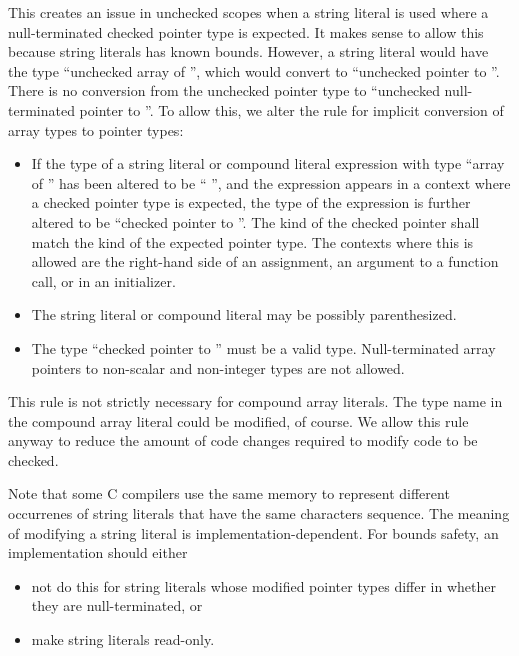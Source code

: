 This creates an issue in unchecked scopes when a string literal is used where
a null-terminated checked pointer type is expected.  It makes sense to allow
this because string literals has known bounds.  However, a string
literal would have the type ``unchecked array of '', which
would convert to ``unchecked pointer to ''.
There is no conversion from the unchecked pointer type to
``unchecked null-terminated pointer to ''.
To allow this, we alter the rule for implicit conversion of array types to pointer types:
\begin{itemize}
\item If the type of a string literal or compound literal expression with type
``array of '' has been altered to be `` \keyword{*}'', and the expression
appears in a context where a checked pointer type is expected, the type of the expression
is further altered to be ``checked pointer to ''.  The kind of the checked
pointer shall match the kind of the expected pointer type. The contexts where this
is allowed are the right-hand side of an assignment, an argument to a function call, or in
an initializer.
\item The string literal or compound literal may be possibly parenthesized.
\item The type ``checked pointer to '' must be a valid type.  Null-terminated array pointers
to non-scalar and non-integer types are not allowed.
\end{itemize}
This rule is not strictly necessary for compound array literals.  The type name in the
compound array literal could be modified, of course.  We allow this rule anyway to reduce
the amount of code changes required to modify code to be checked.

Note that some C compilers use the same memory to represent different
occurrenes of string literals that have the same characters
sequence.  The meaning of modifying a string literal is implementation-dependent.
For bounds safety, an implementation should either
\begin{itemize}
\item not do this for string literals whose modified pointer types differ in whether they are null-terminated, or
\item make string literals read-only.
\end{itemize}

